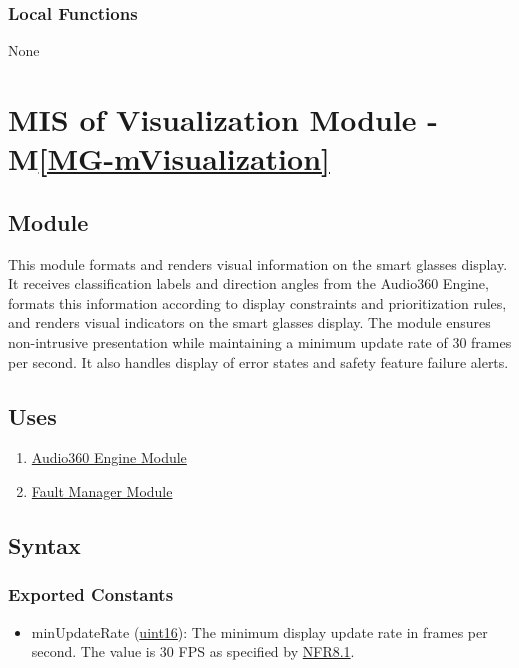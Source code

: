 \documentclass[12pt, titlepage]{article}
\newcommand{\mref}[1]{M\ref{#1}}
\begin{document}
\subsubsection{Local Functions}

None

\newpage 

\section{MIS of Visualization Module \label{mod:Visualization} -
\mref{MG-mVisualization}}

\subsection{Module}

This module formats and renders visual information on the smart glasses display.
It receives classification labels and direction angles from the Audio360 Engine,
formats this information according to display constraints and prioritization
rules, and renders visual indicators on the smart glasses display. The module
ensures non-intrusive presentation while maintaining a minimum update rate of 30
frames per second. It also handles display of error states and safety feature
failure alerts.

\subsection{Uses}

\begin{enumerate}
  \item \hyperref[mod:Audio360Engine]{Audio360 Engine Module}
  \item \hyperref[mod:FaultManager]{Fault Manager Module}
\end{enumerate}

\subsection{Syntax}

\subsubsection{Exported Constants}

\begin{itemize}
  \item minUpdateRate (\hyperref[generic:uint16]{uint16}): 
    \label{var:minUpdateRate}
    The minimum display update rate in frames per second. The value is 30 FPS as
    specified by \hyperref[SRS-NFR8_1]{NFR8.1}.
\end{itemize}
\end{document}
